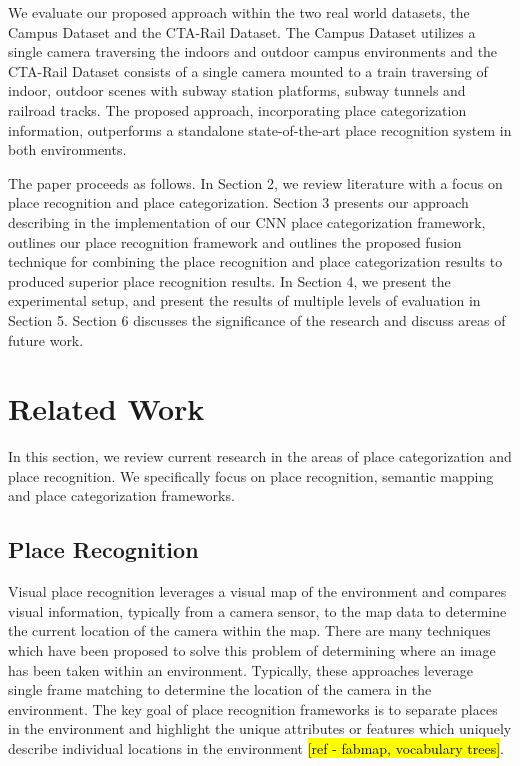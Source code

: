 \documentclass[letterpaper, 10 pt, conference]{ieeeconf}  %
\begin{document}
We evaluate our proposed approach within the two real world datasets, the Campus Dataset and the CTA-Rail Dataset. The Campus Dataset utilizes a single camera traversing the indoors and outdoor campus environments and the CTA-Rail Dataset consists of a single camera mounted to a train traversing of indoor, outdoor scenes with subway station platforms, subway tunnels and railroad tracks. The proposed approach, incorporating place categorization information,  outperforms a standalone state-of-the-art place recognition system in both environments.  

The paper proceeds as follows. In Section 2, we review literature with a focus on place recognition and place categorization. Section 3 presents our approach describing in the implementation of our CNN place categorization framework, outlines our place recognition framework and outlines the proposed fusion technique for combining the place recognition and place categorization results to produced superior place recognition results. In Section 4, we present the experimental setup, and present the results of multiple levels of evaluation in Section 5. Section 6 discusses the significance of the research and discuss areas of future work.

\section{Related Work}
In this section, we review current research in the areas of place categorization and place recognition. We specifically focus on place recognition, semantic mapping and place categorization frameworks. 

\subsection{Place Recognition}
Visual place recognition leverages a visual map of the environment and compares visual information, typically from a camera sensor, to the map data to determine the current location of the camera within the map. There are many techniques which have been proposed to solve this problem of determining where an image has been taken within an environment. Typically, these approaches leverage single frame matching to determine the location of the camera in the environment. The key goal of place recognition frameworks is to separate places in the environment and highlight the unique attributes or features which uniquely describe individual locations in the environment \hl{[ref - fabmap, vocabulary trees]}. 
\end{document}
